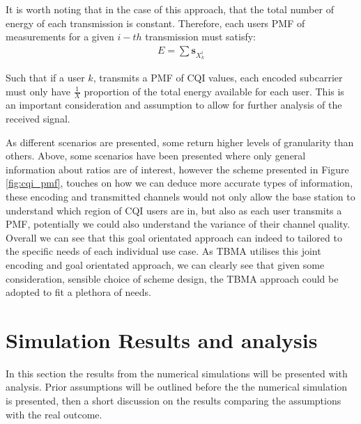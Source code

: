 \documentclass{article}
\begin{document}
It is worth noting that in the case of this approach, that the total number of energy of each transmission is constant. Therefore, each users PMF of measurements for a given $i-th$ transmission must satisfy:
\begin{align}
    E = \sum \boldsymbol{s}_{X^i_k} 
\end{align}

Such that if a user $k$, transmits a PMF of CQI values, each encoded subcarrier must only have $\frac{1}{X}$ proportion of the total energy available for each user. This is an important consideration and assumption to allow for further analysis of the received signal. 


As different scenarios are presented, some return higher levels of granularity than others. Above, some scenarios have been presented where only general information about ratios are of interest, however the scheme presented in Figure \ref{fig:cqi_pmf}, touches on how we can deduce more accurate types of information, these encoding and transmitted channels would not only allow the base station to understand which region of CQI users are in, but also as each user transmits a PMF, potentially we could also understand the variance of their channel quality.  Overall we can see that this goal orientated approach can indeed to tailored to the specific needs of each individual use case. As TBMA utilises this joint encoding and goal orientated approach, we can clearly see that given some consideration, sensible choice of scheme design, the TBMA approach could be adopted to fit a plethora of needs. 


\section{Simulation Results and analysis}\label{sim_results}
In this section the results from the numerical simulations will be presented with analysis. Prior assumptions will be outlined before the the numerical simulation is presented, then a short discussion on the results comparing the assumptions with the real outcome. 
\end{document}

